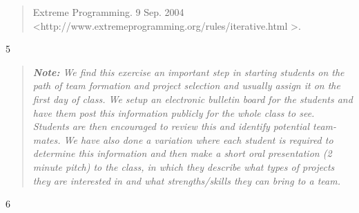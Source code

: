 \documentclass[
]{article}
\begin{document}
\begin{quote}
Extreme Programming. 9 Sep. 2004
\textless http://www.extremeprogramming.org/rules/iterative.html
\textgreater.
\end{quote}

5

\begin{quote}
\emph{\textbf{Note:} We find this exercise an important step in starting
students on the path of team formation and project selection and usually
assign it on the first day of class. We setup an electronic bulletin
board for the students and have them post this information publicly for
the whole class to see. Students are then encouraged to review this and
identify potential team-mates. We have also done a variation where each
student is required to determine this information and then make a short
oral presentation (2 minute pitch) to the class, in which they describe
what types of projects they are interested in and what strengths/skills
they can bring to a team.}
\end{quote}

6
\end{document}
